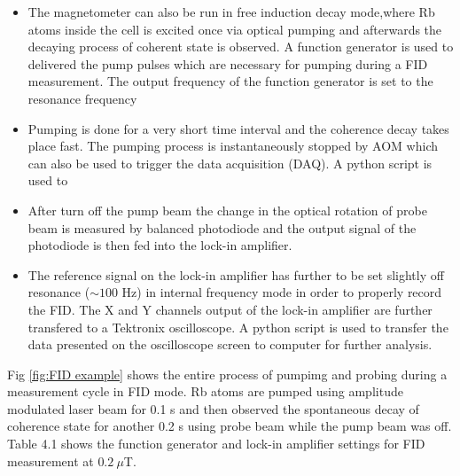 \begin{itemize}
\item The magnetometer can also be run in free induction decay
  mode,where Rb atoms inside the cell is excited once via optical pumping and afterwards
  the decaying process of coherent state is observed. A function
  generator is used to delivered the pump pulses which are necessary
  for pumping during a FID measurement. The output frequency of the
  function generator is set to the resonance frequency
\item Pumping is done for a very short time interval and the coherence decay takes place fast. The pumping process is instantaneously stopped by AOM which can also be used to trigger the  data acquisition (DAQ). A python script is used to 
\item After turn off the pump beam the change in the optical rotation of probe beam is measured by balanced  photodiode and the output signal of the photodiode is then fed into the lock-in amplifier. 
\item The reference signal on the lock-in amplifier has further to be set slightly off resonance ($\sim 100$ Hz) in internal frequency mode in order to properly record the FID.
The X and Y channels output of the lock-in amplifier are further transfered to a Tektronix oscilloscope. A python script is used to transfer the data presented on the oscilloscope screen to computer for further analysis. 
\end{itemize}
Fig \ref{fig:FID example} shows the entire process of pumpimg and probing during a measurement cycle in FID mode. Rb atoms are pumped using amplitude modulated laser beam for 0.1 s and then  observed the spontaneous decay of coherence state for another 0.2 s using probe beam while the pump beam was off. \\
Table 4.1 shows the function generator and lock-in amplifier settings for FID measurement at $0.2~\mu$T.
